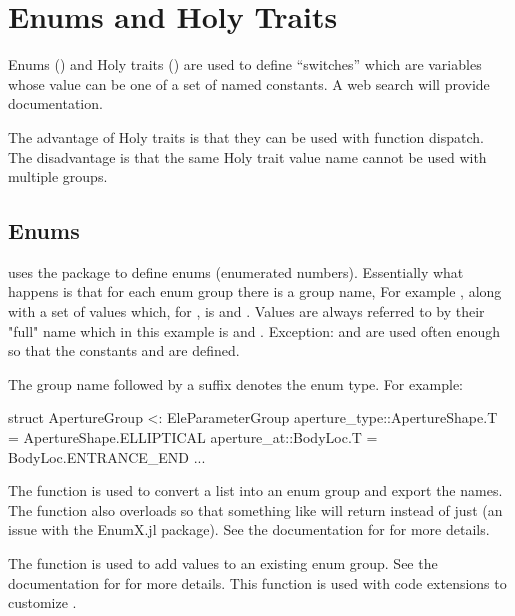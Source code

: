 \chapter{Enums and Holy Traits}
\label{c:enums}

Enums () and Holy traits () are used to define ``switches'' which are
variables whose value can be one of a set of named constants. 
A web search will provide documentation. 

The advantage of Holy traits is that they can be used with function dispatch. The disadvantage is
that the same Holy trait value name cannot be used with multiple groups.

\section{Enums}
\label{s:enums}

\accellat uses the package  to define enums (enumerated numbers).
Essentially what happens is that for each enum group there is a group name, For example ,
along with a set of values which, for , is  and . Values
are always referred to by their "full" name which in this example is  and
. Exception:  and  are
used often enough so that the constants  and  are defined.

The group name followed by a  suffix denotes the enum type.
For example:
\begin{example}
  struct ApertureGroup <: EleParameterGroup
    aperture_type::ApertureShape.T = ApertureShape.ELLIPTICAL
    aperture_at::BodyLoc.T = BodyLoc.ENTRANCE_END
    ...
\end{example}

The  function is used to convert a list into an enum group and export the names.
The  function also overloads  so that something like  
will return  instead of just  (an issue with the EnumX.jl package). 
See the documentation for  for more details.

The  function is used to add values to an existing enum group. See the documentation for
 for more details. This function is used with code extensions to customize \accellat.



